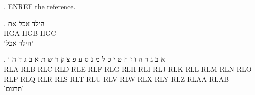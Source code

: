 

\ex. ENREF the reference.

\begin{hebrew}
\ex. \gll הילד אכל את\\
          HGA HGB HGC\\
\glt 'הילד אכל'

\ex. \gll א ב ג ד ה ו ז ח ט י כ ל מ נ ס ע פ צ ק ר ש ת א ב ג ד ה ו\\
          RLA RLB RLC RLD RLE RLF RLG RLH RLI RLJ RLK RLL RLM RLN RLO RLP RLQ RLR RLS RLT RLU RLV RLW RLX RLY RLZ RLAA RLAB\\
\glt 'תרגום'
\end{hebrew}

